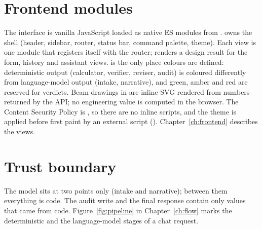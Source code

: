 \section{Frontend modules}
The interface is vanilla JavaScript loaded as native ES modules from .  owns the shell (header, sidebar, router, status bar, command palette, theme). Each view is one module that registers itself with the router;  renders a design result for the form, history and assistant views.  is the only place colours are defined: deterministic output (calculator, verifier, reviser, audit) is coloured differently from language-model output (intake, narrative), and green, amber and red are reserved for verdicts. Beam drawings in  are inline SVG rendered from numbers returned by the API; no engineering value is computed in the browser. The Content Security Policy is , so there are no inline scripts, and the theme is applied before first paint by an external script (). Chapter~\ref{ch:frontend} describes the views.

\section{Trust boundary}
The model sits at two points only (intake and narrative); between them everything is code. The audit write and the final response contain only values that came from code. Figure~\ref{fig:pipeline} in Chapter~\ref{ch:flow} marks the deterministic and the language-model stages of a chat request.
